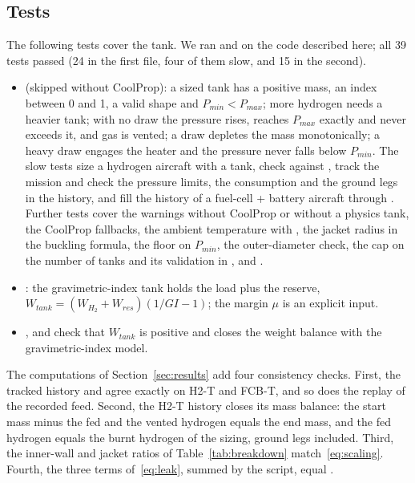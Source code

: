 \documentclass[a4paper,11pt]{article}
\begin{document}
\subsection{Tests}
The following tests cover the tank. We ran  and
 on the code described here; all 39 tests passed (24 in the first file, four of them slow, and 15 in the second).
\begin{itemize}
\item {} (skipped without CoolProp): a sized tank
  has a positive mass, an index between 0 and 1, a valid shape and $P_{min} < P_{max}$; more
  hydrogen needs a heavier tank; with no draw the pressure rises, reaches $P_{max}$ exactly
  and never exceeds it, and gas is vented; a draw depletes the mass monotonically; a heavy
  draw engages the heater and the pressure never falls below $P_{min}$. The slow tests size a
  hydrogen aircraft with a tank, check  against , track the
  mission and check the pressure limits, the consumption and the ground legs in the history,
  and fill the history of a fuel-cell + battery aircraft through . Further
  tests cover the warnings without CoolProp or without a physics tank, the CoolProp fallbacks,
  the ambient temperature with , the jacket radius in the buckling formula, the
  floor on $P_{min}$, the outer-diameter check, the cap on the number of tanks and its
  validation in , and .
\item {}: the gravimetric-index tank holds the load
  plus the reserve, $W_{tank} = (W_{H_2} + W_{res})(1/GI - 1)$; the margin $\mu$ is an
  explicit input.
\item {},  and
   check that $W_{tank}$ is positive and closes the weight balance with
  the gravimetric-index model.
\end{itemize}
The computations of Section~\ref{sec:results} add four consistency checks. First, the tracked
history and  agree exactly on H2-T and FCB-T, and so does the replay
of the recorded feed. Second, the H2-T history closes its mass balance: the start mass minus
the fed and the vented hydrogen equals the end mass, and the fed hydrogen equals the burnt
hydrogen of the sizing, ground legs included. Third, the inner-wall and jacket ratios of
Table~\ref{tab:breakdown} match~\eqref{eq:scaling}. Fourth, the three terms of~\eqref{eq:leak},
summed by the script, equal .
\end{document}
